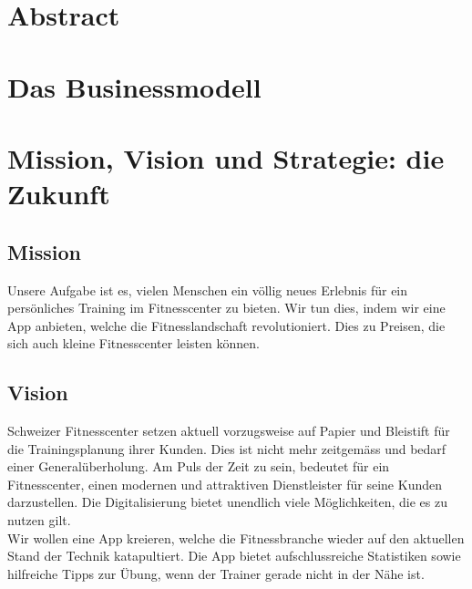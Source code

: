 

\newcommand{\SUBJECT}{Businessplan}
\newcommand{\TITLE}{GitFit}




\section{Abstract}




\section{Das Businessmodell}

\section{Mission, Vision und Strategie: die Zukunft}
\subsection{Mission}
Unsere Aufgabe ist es, vielen Menschen ein völlig neues Erlebnis für ein persönliches Training im Fitnesscenter zu bieten. Wir tun dies, indem wir eine App anbieten, welche die Fitnesslandschaft revolutioniert. Dies zu Preisen, die sich auch kleine Fitnesscenter leisten können.

\subsection{Vision}
Schweizer Fitnesscenter setzen aktuell vorzugsweise auf Papier und Bleistift für die Trainingsplanung ihrer Kunden. Dies ist nicht mehr zeitgemäss und bedarf einer Generalüberholung. Am Puls der Zeit zu sein, bedeutet für ein Fitnesscenter, einen modernen und attraktiven Dienstleister für seine Kunden darzustellen. Die Digitalisierung bietet unendlich viele Möglichkeiten, die es zu nutzen gilt. \\
Wir wollen eine App kreieren, welche die Fitnessbranche wieder auf den aktuellen Stand der Technik katapultiert. Die App bietet aufschlussreiche Statistiken sowie hilfreiche Tipps zur Übung, wenn der Trainer gerade nicht in der Nähe ist.

